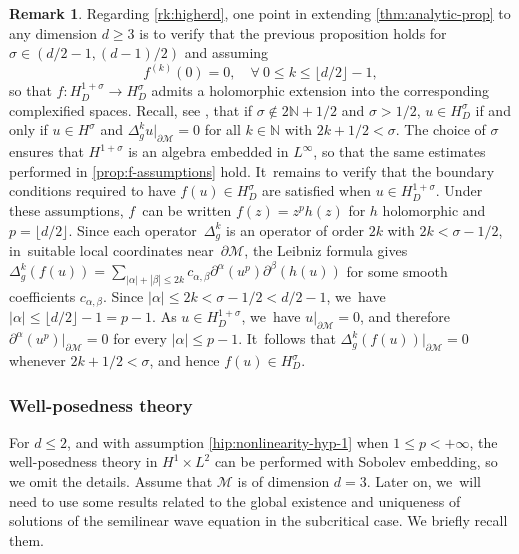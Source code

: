 \documentclass[JEP,XML,SOM,Unicode,published]{cedram}
\theoremstyle{definition}
\newtheorem{remark}[theorem]{Remark}
\let\mc\mathcal
\let\al\alpha
\newcommand{\M}{\mc{M}}
\newcommand{\N}{\mathbb{N}}
\begin{document}
\skpt
\begin{remark}\label{rk:proofhigherd}
Regarding \cref{rk:higherd}, one point in extending \cref{thm:analytic-prop} to any dimension $d\geq 3$ is to verify that the previous proposition holds for $\sigma\in (d/2-1, (d-1)/2)$ and assuming
\begin{equation*}
f^{(k)}(0)=0, \quad \forall~0\leq k\leq \lfloor d/2\rfloor-1,
\end{equation*}
so that $f: H^{1+\sigma}_D\to H^{\sigma}_D$ admits a holomorphic extension into the corresponding complexified spaces. Recall, see \cite{G:67}, that if $\sigma\notin 2\N+1/2$ and $\sigma>1/2$, $u\in H^{\sigma}_D$ if and only if $u\in H^{\sigma}$ and $\Delta_g^ku|_{\partial \M}=0$ for all $k\in \N$ with $2k+1/2< \sigma $. The choice of $\sigma$ ensures that $H^{1+\sigma}$ is an algebra embedded in $L^{\infty}$, so that the same estimates performed in \cref{prop:f-assumptions} hold. It~remains to verify that the boundary conditions required to have $f(u)\in H^{\sigma}_D$ are satisfied when $u\in H_D^{1+\sigma}$. Under these assumptions, $f$~can be written $f(z)=z^{p}h(z)$ for $h$ holomorphic and $p=\lfloor d/2\rfloor$. Since each operator~$\Delta_g^k$ is an operator of order $2k$ with $2k<\sigma-1/2$, in~suitable local coordinates near~$\partial\M$, the Leibniz formula gives $\Delta_g^k (f(u))=\sum_{|\alpha|+|\beta|\leq 2k} c_{\alpha,\beta}\partial^{\alpha}(u^{p})\partial^{\beta}(h(u))$ for some smooth coefficients $c_{\alpha,\beta}$. Since $|\alpha|\leq 2k<\sigma-1/2<d/2-1$, we~have $|\alpha|\leq \lfloor d/2\rfloor-1=p-1$. As $u\in H_D^{1+\sigma}$, we~have $u|_{\partial\M}=0$, and therefore $\partial^{\alpha}(u^{p})|_{\partial\M}=0$ for every $|\al|\leq p-1$. It~follows that $\Delta_g^k(f(u))|_{\partial\M}=0$ whenever $2k+1/2<\sigma$, and hence $f(u)\in H_D^\sigma$.
\end{remark}

\subsubsection{Well-posedness theory} For $d\leq 2$, and with assumption \eqref{hip:nonlinearity-hyp-1} when $1\leq p<+\infty$, the well-posedness theory in $H^1\times L^2$ can be performed with Sobolev embedding, so we omit the details. Assume that $\M$ is of dimension $d=3$. Later on, we~will need to use some results related to the global existence and uniqueness of solutions of the semilinear wave equation in the subcritical case. We briefly recall them.
\end{document}
